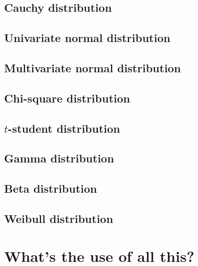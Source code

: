 \subsection{Cauchy distribution}
   \label{sec:cauchy_distribution}
\subsection{Univariate normal distribution}
   \label{sec:normal_distribution}
\subsection{Multivariate normal distribution}
   \label{sec:multinormal_distribution}
\subsection{Chi-square distribution}
   \label{sec:chisquare_distribution}
\subsection{$t$-student distribution}
   \label{sec:tstudent_distribution}
\subsection{Gamma distribution}
   \label{sec:gamma_distribution}
\subsection{Beta distribution}
   \label{sec:beta_distribution}
\subsection{Weibull distribution}
   \label{sec:weibull_distribution}

\section{What's the use of all this?}
